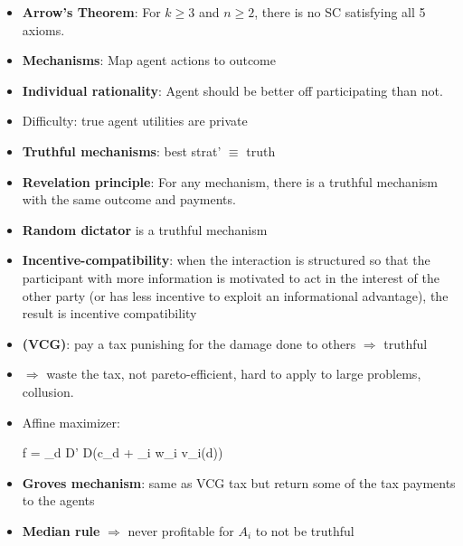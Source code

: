 \documentclass[10pt,a4paper,landscape]{article}
\makeatletter
\DeclareMathOperator*{\argmax}{argmax}
\newenvironment{myalign*}{%
  \setlength{\abovedisplayskip}{3pt}%
  \setlength{\belowdisplayskip}{3pt}%
  \start@align\@ne\st@rredtrue\m@ne
}%
{\endalign}
\makeatother
\begin{document}
\begin{multicols*}{2}
\begin{itemize}
	\item \textbf{Arrow's Theorem}: For $k \geq 3$ and $n \geq 2$, there is no SC satisfying all 5 axioms.
	\item \textbf{Mechanisms}: Map agent actions to outcome
	\item \textbf{Individual rationality}: Agent should be better off participating than not.
	\item Difficulty: true agent utilities are private
	\item \textbf{Truthful mechanisms}: best strat' $\equiv$ truth
	\item \textbf{Revelation principle}: For any mechanism, there is a truthful mechanism with the same outcome and payments.
	\item \textbf{Random dictator} is a truthful mechanism
	\item \textbf{Incentive-compatibility}: when the interaction is structured so that the participant with more information is motivated to act in the interest of the other party (or has less incentive to exploit an informational advantage), the result is incentive compatibility
	\item \textbf{(VCG)}: pay a tax punishing for the damage done to others $\Rightarrow$ truthful
	\begin{comment}
		\begin{align*}
		    tax(A_i) = \sum_{A_j \in A, i \neq j} (v_j (d - i) - v_j () )
		\end{align*}
	\end{comment}
	
	\item $\Rightarrow$ waste the tax, not pareto-efficient, hard to apply to large problems, collusion.
	\item Affine maximizer:
	\begin{myalign*}
	    f = \argmax_{d \in D' \subset D}(c_d + \sum_i w_i v_i(d))
	\end{myalign*}
	\item \textbf{Groves mechanism}: same as VCG tax but return some of the tax payments to the agents
	\item \textbf{Median rule} $\Rightarrow$ never profitable for $A_i$ to not be truthful
\end{itemize}



\end{multicols*}
\end{document}
